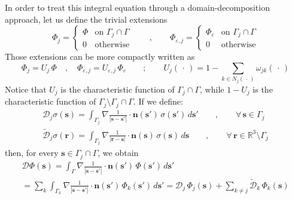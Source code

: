 \documentclass[12pt,letterpaper,oneside]{article}
\theoremstyle{definition}
\begin{document}
In order to treat this integral equation through a domain-decomposition approach, let us define the trivial extensions
\[
\Phi_j =
\begin{cases}
\Phi & \text{on }\Gamma_j \cap \Gamma \\
0 & \text{otherwise}
\end{cases}
\qquad , \qquad 
\Phi_{\varepsilon,j} =
\begin{cases}
\Phi_\varepsilon & \text{on }\Gamma_j \cap \Gamma \\
0 & \text{otherwise}
\end{cases}
\]
Those extensions can be more compactly written as
\[
\Phi_j = U_j \, \Phi \quad , \quad \Phi_{\varepsilon,j} = U_{\varepsilon,j} \, \Phi_\varepsilon  \qquad ; \qquad U_j(\,\cdot\,) = 1 - \sum_{k \in N_j(\,\cdot\,)} \omega_{jk}(\,\cdot\,)
\]
Notice that $U_j$ is the characteristic function of $\Gamma_j \cap \Gamma$, while $1 - U_j$ is the characteristic function of $\Gamma_j \setminus \Gamma_j \cap \Gamma$. If we define:
\begin{gather*}
\mathcal{D}_j \sigma(\boldsymbol{s})  = \int_{\Gamma_j} \nabla \frac{1}{| \boldsymbol{s} - \boldsymbol{s}' |} \cdot \boldsymbol{n} (\boldsymbol{s}') \,\sigma(\boldsymbol{s}') \, d\boldsymbol{s}' \qquad ,\qquad \forall \, \boldsymbol{s} \in \Gamma_j \\
\tilde{\mathcal{D}}_j \sigma(\boldsymbol{r})  = \int_{\Gamma_j} \nabla \frac{1}{| \boldsymbol{r} - \boldsymbol{s} |} \cdot \boldsymbol{n} (\boldsymbol{s}) \,\sigma(\boldsymbol{s}) \, d\boldsymbol{s} \qquad ,\qquad \forall \, \boldsymbol{r} \in \mathbb{R}^3 \setminus \Gamma_j %
\end{gather*}
then, for every $\boldsymbol{s} \in \Gamma_j \cap \Gamma$, we obtain
\begin{multline*}
\mathcal{D} \Phi (\boldsymbol{s}) =  \int_\Gamma \nabla \frac{1}{| \boldsymbol{s} - \boldsymbol{s}' |} \cdot \boldsymbol{n} (\boldsymbol{s}') \,\Phi(\boldsymbol{s}') \, d\boldsymbol{s}'  \\
= \sum_k \int_{\Gamma_k} \nabla \frac{1}{| \boldsymbol{s} - \boldsymbol{s}' |} \cdot \boldsymbol{n} (\boldsymbol{s}') \,\Phi_k(\boldsymbol{s}') \, d\boldsymbol{s}'  = \mathcal{D}_j \, \Phi_j(\boldsymbol{s}) + \sum_{k \ne j} \tilde{\mathcal{D}}_k \, \Phi_k(\boldsymbol{s})
\end{multline*}
\end{document}
